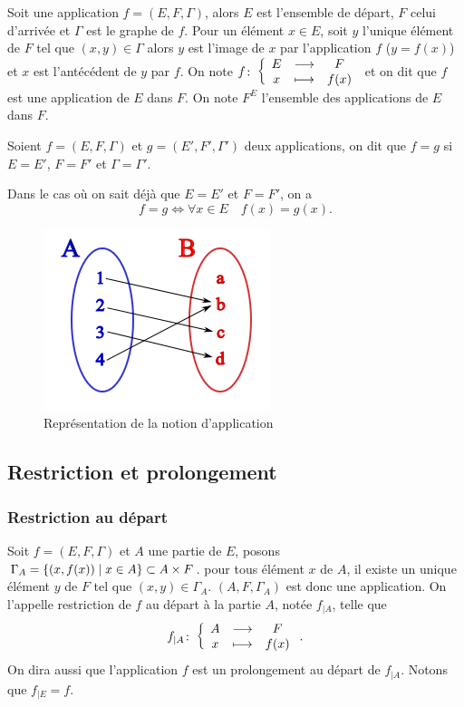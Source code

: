 Soit une application $f=(E,F,\Gamma)$, alors $E$ est l'ensemble de départ, $F$ celui d'arrivée et $\Gamma$ est le graphe de $f$. Pour un élément $x \in E$, soit $y$ l'unique élément de $F$ tel que $(x,y) \in \Gamma$ alors $y$ est l'image de $x$ par l'application $f$ ($y=f(x)$) et $x$ est l'antécédent de $y$ par $f$. On note $f\colon \left\{\begin{array}{ccc} E & \longrightarrow &F\\ x & \longmapsto & f(x) \end{array} \right.$ et on dit que $f$ est une application de $E$ dans $F$. On note $F^E$ l'ensemble des applications de $E$ dans $F$.
%
\begin{defdef}
  Soient $f=(E,F,\Gamma)$ et $g=(E',F',\Gamma')$ deux applications, on dit que $f=g$ si $E=E'$, $F=F'$ et $\Gamma=\Gamma'$.
\end{defdef}
Dans le cas où on sait déjà que $E=E'$ et $F=F'$, on a
\begin{equation}
  f=g \iff \forall x \in E \quad f(x)=g(x).
\end{equation}
%
\begin{figure}
  \centering
  \includegraphics[scale=0.7]{application.png}
  \caption{Représentation de la notion d'application}
  \label{chap3-fig:application}
\end{figure}
%
\subsection{Restriction et prolongement}
\label{chap3-restrictionetprolongement}
\subsubsection{Restriction au départ} 
\label{chap3-subsubsec:restrictiondep}
Soit $f=(E,F,\Gamma)$ et $A$ une partie de $E$, posons $\Gamma_A=\left\{(x,f(x))\mathrel{}\middle|\mathrel{}x \in A\right\} \subset A \times F$. pour tous élément $x$ de $A$, il existe un unique élément $y$ de $F$ tel que $(x,y) \in \Gamma_A$. $(A,F, \Gamma_A)$ est donc une application. On l'appelle restriction de $f$ au départ à la partie $A$, notée $f_{|A}$, telle que
\begin{equation}
f_{|A}\colon \left\{\begin{array}{ccc} A & \longrightarrow &F\\ x & \longmapsto & f(x) \end{array} \right..
\end{equation}
On dira aussi que l'application $f$ est un prolongement au départ de $f_{|A}$. Notons que $f_{|E}=f$.
%
